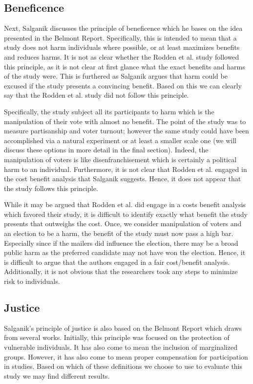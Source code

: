 \documentclass[12pt]{article}
\begin{document}
\subsection{Beneficence}

Next, Salganik discusses the principle of beneficence which he bases on the idea presented in the Belmont Report. Specifically, this is intended to mean that a study does not harm individuals where possible, or at least maximizes benefits and reduces harms. It is not as clear whether the Rodden et al. study followed this principle, as it is not clear at first glance what the exact benefits and harms of the study were. This is furthered as Salganik argues that harm could be excused if the study presents a convincing benefit. Based on this we can clearly say that the Rodden et al. study did not follow this principle.

Specifically, the study subject all its participants to harm which is the manipulation of their vote with almost no benefit. The point of the study was to measure partisanship and voter turnout; however the same study could have been accomplished via a natural experiment or at least a smaller scale one (we will discuss these options in more detail in the final section). Indeed, the manipulation of voters is like disenfranchisement which is certainly a political harm to an individual. Furthermore, it is not clear that Rodden et al. engaged in the cost benefit analysis that Salganik suggests. Hence, it does not appear that the study follows this principle.

While it may be argued that Rodden et al. did engage in a costs benefit analysis which favored their study, it is difficult to identify exactly what benefit the study presents that outweighs the cost. Once, we consider manipulation of voters and an election to be a harm, the benefit of the study must now pass a high bar. Especially since if the mailers did influence the election, there may be a broad public harm as the preferred candidate may not have won the election. Hence, it is difficult to argue that the authors engaged in a fair cost/benefit analysis. Additionally, it is not obvious that the researchers took any steps to minimize risk to individuals.

\subsection{Justice}

Salganik’s principle of justice is also based on the Belmont Report which draws from several works. Initially, this principle was focused on the protection of vulnerable individuals. It has also come to mean the inclusion of marginalized groups. However, it has also come to mean proper compensation for participation in studies. Based on which of these definitions we choose to use to evaluate this study we may find different results. 
\end{document}
